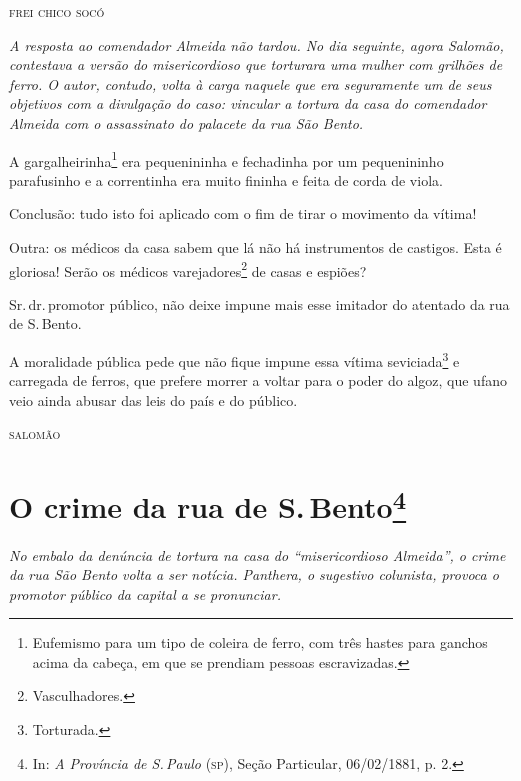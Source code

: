 {\medskip
\hfill\textsc{frei chico socó}


\begin{resumo}
\emph{A resposta ao comendador Almeida não tardou. No dia seguinte,
agora Salomão, contestava a versão do misericordioso que
torturara uma mulher com grilhões de ferro. O autor, contudo, volta à carga naquele que era seguramente um
de seus objetivos com a divulgação do caso: vincular a tortura da casa
do comendador Almeida com o assassinato do palacete da rua São Bento. }
\end{resumo}

A gargalheirinha\footnote{Eufemismo para um tipo de coleira de ferro,
  com três hastes para ganchos acima da cabeça, em que se prendiam
  pessoas escravizadas.} era pequenininha e fechadinha por um
pequenininho parafusinho e a correntinha era muito fininha e feita de
corda de viola.

Conclusão: tudo isto foi aplicado com o fim de tirar o movimento da
vítima!

Outra: os médicos da casa sabem que lá não há instrumentos de castigos.
Esta é gloriosa! Serão os médicos varejadores\footnote{Vasculhadores.}
de casas e espiões?

Sr.\,dr.\,promotor público, não deixe impune mais esse imitador do
atentado da rua de S.\,Bento.

A moralidade pública pede que não fique impune essa vítima
seviciada\footnote{Torturada.}
e carregada de ferros, que
prefere morrer a voltar para o poder do algoz, que ufano veio ainda
abusar das leis do país e do público.

\hfill\textsc{salomão}

\chapter{O crime da rua de S.\,Bento\footnote{In: \emph{A Província
  de S.\,Paulo} (\textsc{sp}), Seção Particular, 06/02/1881, p. 2.}}

\begin{resumo}
\emph{No embalo da denúncia de tortura na casa do ``misericordioso
Almeida'', o crime da rua São Bento volta a ser notícia. Panthera,
o sugestivo colunista, provoca o promotor público da capital a se
pronunciar. }
\end{resumo}

}
